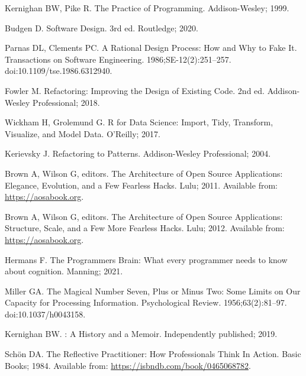 \documentclass[10pt,letterpaper]{article}
\begin{document}
\begin{thebibliography}{10}

Kernighan BW, Pike R.
\newblock The Practice of Programming.
\newblock Addison-Wesley; 1999.

Budgen D.
\newblock Software Design.
\newblock 3rd ed. Routledge; 2020.

Parnas DL, Clements PC.
\newblock A Rational Design Process: How and Why to Fake It.
 Transactions on Software Engineering.
  1986;{SE}-12(2):251--257.
\newblock doi:{10.1109/tse.1986.6312940}.

Fowler M.
\newblock Refactoring: Improving the Design of Existing Code.
\newblock 2nd ed. Addison-Wesley Professional; 2018.

Wickham H, Grolemund G.
\newblock R for Data Science: Import, Tidy, Transform, Visualize, and Model
  Data.
\newblock O'Reilly; 2017.

Kerievsky J.
\newblock Refactoring to Patterns.
\newblock Addison-Wesley Professional; 2004.

Brown A, Wilson G, editors.
\newblock The Architecture of Open Source Applications: Elegance, Evolution,
  and a Few Fearless Hacks.
\newblock Lulu; 2011.
\newblock Available from: \url{https://aosabook.org}.

Brown A, Wilson G, editors.
\newblock The Architecture of Open Source Applications: Structure, Scale, and a
  Few More Fearless Hacks.
\newblock Lulu; 2012.
\newblock Available from: \url{https://aosabook.org}.

Hermans F.
\newblock The Programmer{\textquotesingle}s Brain: What every programmer needs
  to know about cognition.
\newblock Manning; 2021.

Miller GA.
\newblock The Magical Number Seven, Plus or Minus Two: Some Limits on Our
  Capacity for Processing Information.
\newblock Psychological Review. 1956;63(2):81--97.
\newblock doi:{10.1037/h0043158}.

Kernighan BW.
: A History and a Memoir.
\newblock Independently published; 2019.

Schön DA.
\newblock The Reflective Practitioner: How Professionals Think In Action.
\newblock Basic Books; 1984.
\newblock Available from: \url{https://isbndb.com/book/0465068782}.


\end{thebibliography}
\end{document}
